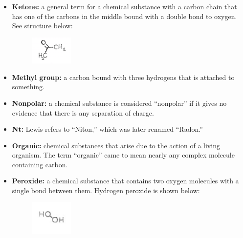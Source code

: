 \documentclass[11pt]{memoir}
\begin{document}
\begin{itemize}
\item[]{\textbf{Ketone:} a general term for a chemical substance with a carbon chain that has one of the carbons in the middle bound with a double bond to oxygen.  See structure below:}

\begin{figure}[h]
\vspace{-15pt}
\begin{center}
\includegraphics[width=0.2\textwidth]{images/lewis_notefig8.png}
\end{center}
\vspace{-30pt}
\end{figure}


\item[]{\textbf{Methyl group:} a carbon bound with three hydrogens that is attached to something.}

\item[]{\textbf{Nonpolar:} a chemical substance is considered ``nonpolar'' if it gives no evidence that there is any separation of charge.}

\item[]{\textbf{Nt:} Lewis refers to ``Niton,'' which was later renamed ``Radon.''}

\item[]{\textbf{Organic:} chemical substances that arise due to the action of a living organism.  The term ``organic'' came to mean nearly any complex molecule containing carbon.}

\item[]{\textbf{Peroxide:} a chemical substance that contains two oxygen molecules with a single bond between them.  Hydrogen peroxide is shown below:}

\begin{figure}[h]
\vspace{-15pt}
\begin{center}
\includegraphics[width=0.2\textwidth]{images/lewis_notefig8a.png}
\end{center}
\vspace{-30pt}
\end{figure}



\end{itemize}
\end{document}
